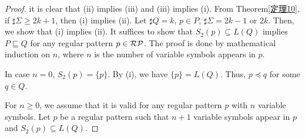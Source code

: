 \begin{proof}
    it is clear that (ii) implies (iii) and (iii) implies (i).
    From Theorem\ref{定理10}, if $\sharp\Sigma \geq 2k+1$, then
    (i) implies (ii).
    Let $\sharp Q = k$, $p \in P$, $\sharp\Sigma = 2k-1$ or $2k$.
    Then, we show that (i) implies (ii).
    It suffices to show that $S_{2}(p) \subseteq L(Q)$ implies $P \sqsubseteq Q$
    for any regular pattern $p \in \mathcal{RP}$.
    The proof is done by mathematical induction on $n$, where $n$ is the number of variable symbols appears in $p$.


    In case $n=0$, $S_{2}(p) = \{p\}$.
    By (i), we have $\{p\} = L(Q)$. Thus, $p \preceq q$ for some $q \in Q$.

    For $n \geq 0$,
    we assume that it is valid for any regular pattern $p$
    with $n$ variable symbols.
    Let $p$ be a regular pattern such that $n+1$ variable symbols appear in $p$
    and $S_{2}(p) \subseteq L(Q)$.


\end{proof}
